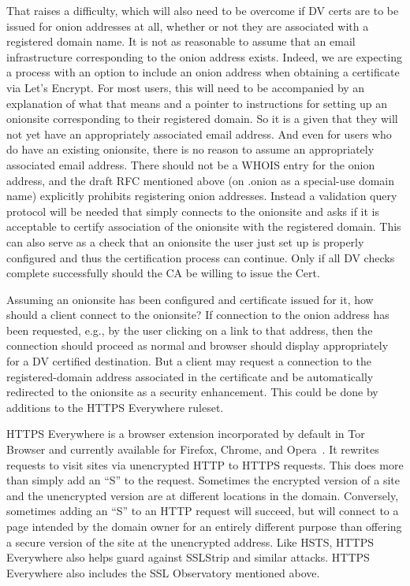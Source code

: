 \documentclass[10pt, conference, compsocconf]{styles/IEEEtran}
\begin{document}
That raises a difficulty, which will also need to be overcome if DV
certs are to be issued for onion addresses at all, whether or not they
are associated with a registered domain name.  It is not as reasonable
to assume that an email infrastructure corresponding to the onion
address exists. Indeed, we are expecting a process with an option to
include an onion address when obtaining a certificate via Let's
Encrypt.  For most users, this will need to be accompanied by an
explanation of what that means and a pointer to instructions for
setting up an onionsite corresponding to their registered domain. So
it is a given that they will not yet have an appropriately associated
email address.  And even for users who do have an existing onionsite,
there is no reason to assume an appropriately associated email
address. There should not be a WHOIS entry for the onion address, and
the draft RFC mentioned above (on .onion as a special-use domain name)
explicitly prohibits registering onion addresses.  Instead a
validation query protocol will be needed that simply connects to the
onionsite and asks if it is acceptable to certify association of the
onionsite with the registered domain.  This can also serve as a check
that an onionsite the user just set up is properly configured and thus
the certification process can continue.  Only if all DV checks
complete successfully should the CA be willing to issue the Cert.


Assuming an onionsite has been configured and certificate issued for
it, how should a client connect to the onionsite? If connection
to the onion address has been requested, e.g., by the user
clicking on a link to that address, then the connection should
proceed as normal and browser should display appropriately for a
DV certified destination. But a client may request a connection
to the registered-domain address associated in the certificate
and be automatically redirected to the onionsite as a security
enhancement. This could be done by additions to the HTTPS Everywhere
ruleset.

HTTPS Everywhere is a browser extension incorporated by default in Tor
Browser and currently available for Firefox, Chrome, and
Opera~\cite{https-everywhere}. It rewrites requests to visit sites via
unencrypted HTTP to HTTPS requests. This does more than simply add an
``S'' to the request. Sometimes the encrypted version of a site and
the unencrypted version are at different locations in the domain.
Conversely, sometimes adding an ``S'' to an HTTP request will
succeed, but will connect to a page intended by the domain owner for an
entirely different purpose than offering a secure version of the site
at the unencrypted address.  Like HSTS, HTTPS Everywhere also helps
guard against SSLStrip and similar attacks. HTTPS Everywhere
also includes the SSL Observatory mentioned above.
\end{document}
